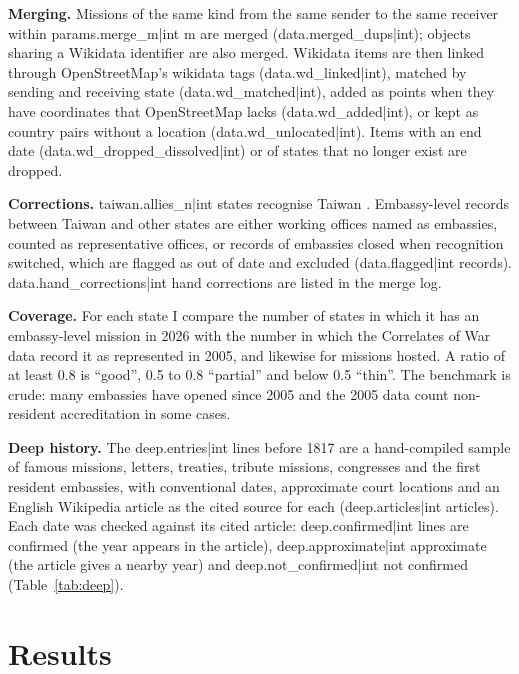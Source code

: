 \documentclass[11pt,a4paper]{article}
\begin{document}
\textbf{Merging.} Missions of the same kind from the same sender to the same receiver within {{params.merge_m|int}} m are merged ({{data.merged_dups|int}}); objects sharing a Wikidata identifier are also merged. Wikidata items are then linked through OpenStreetMap's wikidata tags ({{data.wd_linked|int}}), matched by sending and receiving state ({{data.wd_matched|int}}), added as points when they have coordinates that OpenStreetMap lacks ({{data.wd_added|int}}), or kept as country pairs without a location ({{data.wd_unlocated|int}}). Items with an end date ({{data.wd_dropped_dissolved|int}}) or of states that no longer exist are dropped.

\textbf{Corrections.} {{taiwan.allies_n|int}} states recognise Taiwan \citep{reuters}. Embassy-level records between Taiwan and other states are either working offices named as embassies, counted as representative offices, or records of embassies closed when recognition switched, which are flagged as out of date and excluded ({{data.flagged|int}} records). {{data.hand_corrections|int}} hand corrections are listed in the merge log.

\textbf{Coverage.} For each state I compare the number of states in which it has an embassy-level mission in 2026 with the number in which the Correlates of War data record it as represented in 2005, and likewise for missions hosted. A ratio of at least 0.8 is ``good'', 0.5 to 0.8 ``partial'' and below 0.5 ``thin''. The benchmark is crude: many embassies have opened since 2005 and the 2005 data count non-resident accreditation in some cases.

\textbf{Deep history.} The {{deep.entries|int}} lines before 1817 are a hand-compiled sample of famous missions, letters, treaties, tribute missions, congresses and the first resident embassies, with conventional dates, approximate court locations and an English Wikipedia article as the cited source for each ({{deep.articles|int}} articles). Each date was checked against its cited article: {{deep.confirmed|int}} lines are confirmed (the year appears in the article), {{deep.approximate|int}} approximate (the article gives a nearby year) and {{deep.not_confirmed|int}} not confirmed (Table~\ref{tab:deep}).

\section{Results}
\end{document}
